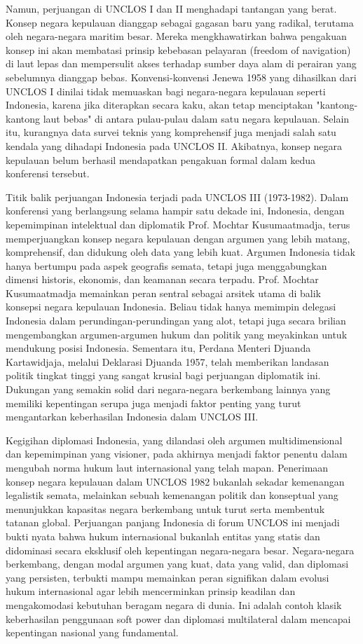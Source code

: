 \documentclass[12pt, a4paper]{article}
\begin{document}
Namun, perjuangan di UNCLOS I dan II menghadapi tantangan yang berat. Konsep negara kepulauan dianggap sebagai gagasan baru yang radikal, terutama oleh negara-negara maritim besar. Mereka mengkhawatirkan bahwa pengakuan konsep ini akan membatasi prinsip kebebasan pelayaran (freedom of navigation) di laut lepas dan mempersulit akses terhadap sumber daya alam di perairan yang sebelumnya dianggap bebas. Konvensi-konvensi Jenewa 1958 yang dihasilkan dari UNCLOS I dinilai tidak memuaskan bagi negara-negara kepulauan seperti Indonesia, karena jika diterapkan secara kaku, akan tetap menciptakan "kantong-kantong laut bebas" di antara pulau-pulau dalam satu negara kepulauan. Selain itu, kurangnya data survei teknis yang komprehensif juga menjadi salah satu kendala yang dihadapi Indonesia pada UNCLOS II. Akibatnya, konsep negara kepulauan belum berhasil mendapatkan pengakuan formal dalam kedua konferensi tersebut.  

Titik balik perjuangan Indonesia terjadi pada UNCLOS III (1973-1982). Dalam konferensi yang berlangsung selama hampir satu dekade ini, Indonesia, dengan kepemimpinan intelektual dan diplomatik Prof. Mochtar Kusumaatmadja, terus memperjuangkan konsep negara kepulauan dengan argumen yang lebih matang, komprehensif, dan didukung oleh data yang lebih kuat. Argumen Indonesia tidak hanya bertumpu pada aspek geografis semata, tetapi juga menggabungkan dimensi historis, ekonomis, dan keamanan secara terpadu. Prof. Mochtar Kusumaatmadja memainkan peran sentral sebagai arsitek utama di balik konsepsi negara kepulauan Indonesia. Beliau tidak hanya memimpin delegasi Indonesia dalam perundingan-perundingan yang alot, tetapi juga secara brilian mengembangkan argumen-argumen hukum dan politik yang meyakinkan untuk mendukung posisi Indonesia. Sementara itu, Perdana Menteri Djuanda Kartawidjaja, melalui Deklarasi Djuanda 1957, telah memberikan landasan politik tingkat tinggi yang sangat krusial bagi perjuangan diplomatik ini. Dukungan yang semakin solid dari negara-negara berkembang lainnya yang memiliki kepentingan serupa juga menjadi faktor penting yang turut mengantarkan keberhasilan Indonesia dalam UNCLOS III.  

Kegigihan diplomasi Indonesia, yang dilandasi oleh argumen multidimensional dan kepemimpinan yang visioner, pada akhirnya menjadi faktor penentu dalam mengubah norma hukum laut internasional yang telah mapan. Penerimaan konsep negara kepulauan dalam UNCLOS 1982 bukanlah sekadar kemenangan legalistik semata, melainkan sebuah kemenangan politik dan konseptual yang menunjukkan kapasitas negara berkembang untuk turut serta membentuk tatanan global. Perjuangan panjang Indonesia di forum UNCLOS ini menjadi bukti nyata bahwa hukum internasional bukanlah entitas yang statis dan didominasi secara eksklusif oleh kepentingan negara-negara besar. Negara-negara berkembang, dengan modal argumen yang kuat, data yang valid, dan diplomasi yang persisten, terbukti mampu memainkan peran signifikan dalam evolusi hukum internasional agar lebih mencerminkan prinsip keadilan dan mengakomodasi kebutuhan beragam negara di dunia. Ini adalah contoh klasik keberhasilan penggunaan soft power dan diplomasi multilateral dalam mencapai kepentingan nasional yang fundamental.
\end{document}
